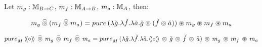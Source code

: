 \begin{lemma}\label{lemma:pappl_comp_appl}
Let $m_g:\mathbb{M}_{B\rightarrow C}$, $m_f:\mathbb{M}_{A\rightarrow B}$, $m_a:\mathbb{M}_{A}$, then:

$$
m_g \alift{\pappl} (m_f \alift{\pappl} m_a)
 = \apure\, (\lambda \pstr{g}. \lambda \pstr{f}. \lambda \pstr{a}. \pstr{g} \pappl (\pstr{f}\pappl \pstr{a})) \appl m_g \appl m_f \appl m_a
$$

\end{lemma}


\begin{lemma}\label{lemma:ppair}

$$
\apure_M\,\ppair{\comp}\, \alift{\pappl}\, m_g\, \alift{\pappl}\, m_f\, \alift{\pappl}\, m_a
= \apure_M\,(\lambda \pstr{g}. \lambda \pstr{f}. \lambda \pstr{a}. \ppair{\comp}\, \pappl\, \pstr{g} \, \pappl\, \pstr{f} \, \pappl\, \pstr{a})\, \appl\, m_g\, \appl\, m_f\, \appl\, m_a 
$$

\end{lemma}


